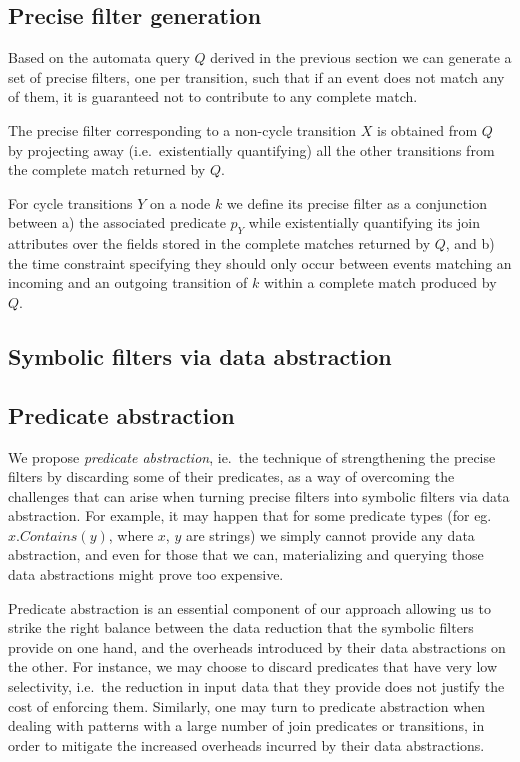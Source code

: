 \subsection{Precise filter generation}
\label{sec:prec_filter_generation}

Based on the automata query $Q$ derived in the previous section we can generate
a set of precise filters, one per transition, such that if an event does not match
any of them, it is guaranteed not to contribute to any complete match.

The precise filter corresponding to a non-cycle transition $X$ is obtained from
$Q$ by projecting away (i.e.\ existentially quantifying) all the other transitions
from the complete match returned by $Q$.

For cycle transitions $Y$ on a node $k$ we define its precise filter as a
conjunction between 
a) the associated predicate $p_Y$ while existentially quantifying its join
attributes over the fields stored in the complete matches returned by $Q$, and
b) the time constraint specifying they should only occur between events matching
an incoming and an outgoing transition of $k$ within a complete match produced
by $Q$.

\subsection{Symbolic filters via data abstraction}
\label{sec:data_abstraction}


\subsection{Predicate abstraction}
\label{sec:pred_abstraction}


We propose {\em predicate abstraction}, ie.\ the technique of strengthening the
precise filters by discarding some of their predicates, as a way of overcoming
the challenges that can arise when turning precise filters into symbolic filters
via data abstraction.
For example, it may happen that for some predicate types
(for eg.\ $x.Contains(y)$, where $x$, $y$ are strings) we simply cannot provide
any data abstraction, and even for those that we can, materializing and querying
those data abstractions might prove too expensive.

Predicate abstraction is an essential component of our approach
allowing us to strike the right balance between the data reduction that the
symbolic filters provide on one hand, and the overheads introduced by their
data abstractions on the other.
For instance, we may choose to discard
predicates that have very low selectivity, i.e.\ the reduction in input data
that they provide does not justify the cost of enforcing them.
Similarly, one may turn to predicate abstraction when dealing with patterns with
a large number of join predicates or transitions, in order to mitigate the
increased overheads incurred by their data abstractions.

